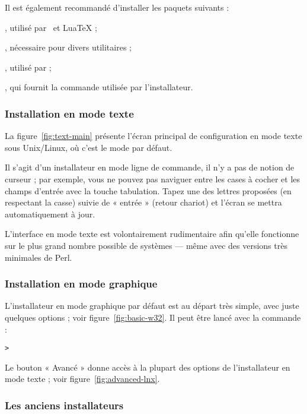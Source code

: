 \documentclass[german, english, french, 12pt]{article}
\begin{document}
Il est également recommandé d'installer les paquets suivants :
\begin{itemize*}
\item {}, utilisé par \XeTeX\ et Lua\TeX{} ;
\item {}, nécessaire pour divers utilitaires ;
\item {}, utilisé par  ;
\item {}, qui fournit la commande  utilisée par
  l'installateur.
\end{itemize*}

\subsubsection{Installation en mode texte}

La figure~\ref{fig:text-main} présente l'écran principal de configuration en
mode texte sous Unix/Linux, où c'est le mode par défaut.

Il s'agit d'un installateur en mode ligne de commande, il n'y a pas de notion de
curseur ; par exemple, vous ne pouvez pas naviguer entre les cases à cocher et
les champs d'entrée avec la touche tabulation. Tapez une des lettres proposées
(en respectant la casse) suivie de « entrée » (retour chariot) et l'écran se
mettra automatiquement à jour.

L'interface en mode texte est volontairement rudimentaire afin qu'elle fonctionne
sur le plus grand nombre possible de systèmes --- même avec des versions très
minimales de Perl.

\subsubsection{Installation en mode graphique}
\label{sec:graphical-inst}

L'installateur en mode graphique par défaut est au départ très simple, avec
juste quelques options ; voir figure~\ref{fig:basic-w32}. Il peut être lancé
avec la commande :
\begin{alltt}
> 
\end{alltt}

Le bouton « Avancé » donne accès à la plupart des options de l'installateur en
mode texte ; voir figure~\ref{fig:advanced-lnx}.

\subsubsection{Les anciens installateurs}
\end{document}
